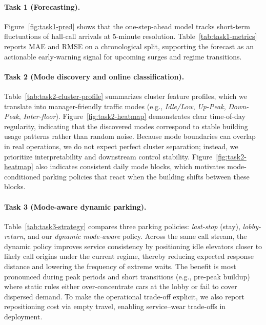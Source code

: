 \paragraph{Task 1 (Forecasting).}
Figure~\ref{fig:task1-pred} shows that the one-step-ahead model tracks short-term fluctuations of hall-call arrivals at 5-minute resolution.
Table~\ref{tab:task1-metrics} reports MAE and RMSE on a chronological split, supporting the forecast as an actionable early-warning signal for upcoming surges and regime transitions.

\paragraph{Task 2 (Mode discovery and online classification).}
Table~\ref{tab:task2-cluster-profile} summarizes cluster feature profiles, which we translate into manager-friendly traffic modes (e.g., \emph{Idle/Low}, \emph{Up-Peak}, \emph{Down-Peak}, \emph{Inter-floor}).
Figure~\ref{fig:task2-heatmap} demonstrates clear time-of-day regularity, indicating that the discovered modes correspond to stable building usage patterns rather than random noise.
Because mode boundaries can overlap in real operations, we do not expect perfect cluster separation; instead, we prioritize interpretability and downstream control stability.
Figure~\ref{fig:task2-heatmap} also indicates consistent daily mode blocks, which motivates mode-conditioned parking policies that react when the building shifts between these blocks.


\paragraph{Task 3 (Mode-aware dynamic parking).}
Table~\ref{tab:task3-strategy} compares three parking policies: \emph{last-stop} (stay), \emph{lobby-return}, and our \emph{dynamic mode-aware} policy.
Across the same call stream, the dynamic policy improves service consistency by positioning idle elevators closer to likely call origins under the current regime, thereby reducing expected response distance and lowering the frequency of extreme waits.
The benefit is most pronounced during peak periods and short transitions (e.g., pre-peak buildup) where static rules either over-concentrate cars at the lobby or fail to cover dispersed demand.
To make the operational trade-off explicit, we also report repositioning cost via empty travel, enabling service--wear trade-offs in deployment.



